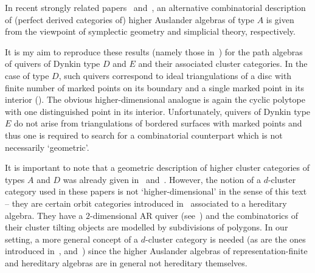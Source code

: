 \documentclass[a4paper,oneside,svgnames]{amsart}
\theoremstyle{plain}
\theoremstyle{definition}
\begin{document}
 In recent strongly related papers~\cite{djw} and~\cite{djy}, an alternative
 combinatorial description of (perfect derived categories of) higher Auslander
 algebras of type $A$ is given from the viewpoint of symplectic geometry and
 simplicial theory, respectively.

 It is my aim to reproduce these results (namely those in~\cite{ot}) for the
 path algebras of quivers of Dynkin type $D$ and $E$ and their associated
 cluster categories. In the case of type $D$, such quivers correspond to ideal
 triangulations of a disc with finite number of marked points on its boundary
 and a single marked point in its interior (\cite{fst}). The obvious
 higher-dimensional analogue is again the cyclic polytope with one distinguished
 point in its interior. Unfortunately, quivers of Dynkin type $E$ do not arise
 from triangulations of bordered surfaces with marked points and thus one is
 required to search for a combinatorial counterpart which is not necessarily
 `geometric'.

 It is important to note that a geometric description of higher cluster
 categories of types $A$ and $D$ was already given in~\cite{bm1} and~\cite{bm2}.
 However, the notion of a $d$-cluster category used in these papers is not
 `higher-dimensional' in the sense of this text -- they are certain orbit
 categories introduced in~\cite{k} associated to a hereditary algebra. They have
 a $2$-dimensional AR quiver (see~\cite[Section 6]{iya}) and the combinatorics
 of their cluster tilting objects are modelled by subdivisions of polygons. In
 our setting, a more general concept of a $d$-cluster category is needed (as are
 the ones introduced in~\cite{amiot2}, \cite{amiot1} and~\cite{guo}) since the
 higher Auslander algebras of representation-finite and hereditary algebras are
 in general not hereditary themselves.
\end{document}
